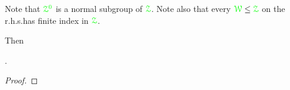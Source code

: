 
Note that $\color{green}\EuScript Z^0$ is a normal subgroup of ${\color{green}\EuScript Z}$.
Note also that every ${\color{green}\EuScript W}\le{\color{green}\EuScript Z}$ on the r.h.s.\@ has finite index in ${\color{green}\EuScript Z}$.


  




\begin{proposition}\label{prop_Z0_inclusione1}
  Then                            

  .
 
\end{proposition}

\begin{proof}
  
\end{proof}

